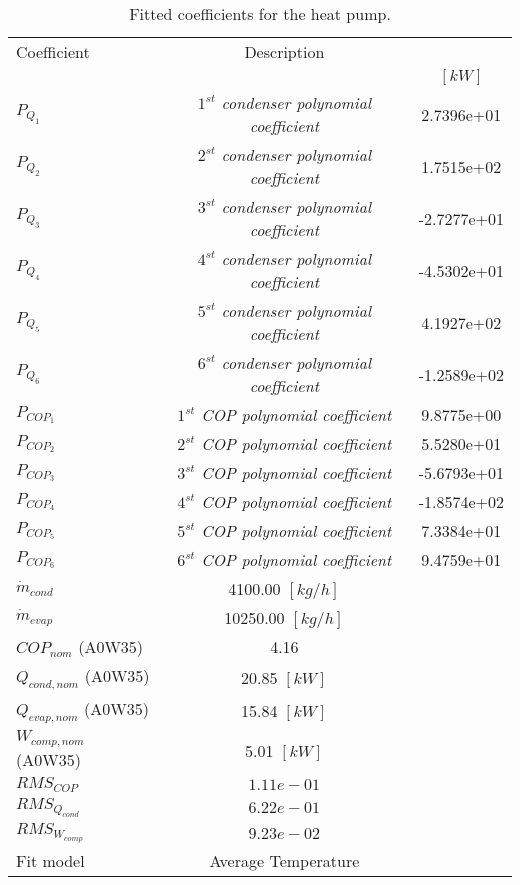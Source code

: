 \documentclass[english]{SPFShortReport}
\author{Dani Carbonell}
\begin{document}
\begin{table}[!ht]
\begin{small}
\caption{Fitted coefficients for the heat pump.}
\begin{center}
\resizebox{12cm}{!} 
{
\begin{tabular}{l | c c } 
\hline
\hline
Coefficient &Description & \\ 
 & &$[kW]$\\ 
\hline
$P_{Q_{1}}$ & \emph{$1^{st}$ condenser polynomial coefficient}  & 2.7396e+01    \\ 
$P_{Q_{2}}$ & \emph{$2^{st}$ condenser polynomial coefficient}  & 1.7515e+02    \\ 
$P_{Q_{3}}$ & \emph{$3^{st}$ condenser polynomial coefficient}  & -2.7277e+01    \\ 
$P_{Q_{4}}$ & \emph{$4^{st}$ condenser polynomial coefficient}  & -4.5302e+01    \\ 
$P_{Q_{5}}$ & \emph{$5^{st}$ condenser polynomial coefficient}  & 4.1927e+02    \\ 
$P_{Q_{6}}$ & \emph{$6^{st}$ condenser polynomial coefficient}  & -1.2589e+02    \\ 
\hline
$P_{COP_{1}}$ & \emph{$1^{st}$ COP polynomial coefficient}  & 9.8775e+00    \\ 
$P_{COP_{2}}$ & \emph{$2^{st}$ COP polynomial coefficient}  & 5.5280e+01    \\ 
$P_{COP_{3}}$ & \emph{$3^{st}$ COP polynomial coefficient}  & -5.6793e+01    \\ 
$P_{COP_{4}}$ & \emph{$4^{st}$ COP polynomial coefficient}  & -1.8574e+02    \\ 
$P_{COP_{5}}$ & \emph{$5^{st}$ COP polynomial coefficient}  & 7.3384e+01    \\ 
$P_{COP_{6}}$ & \emph{$6^{st}$ COP polynomial coefficient}  & 9.4759e+01    \\ 
\hline
$\dot m_{cond}$ & 4100.00 $[kg/h]$ \\ 
$\dot m_{evap}$ & 10250.00 $[kg/h]$ \\ 
\hline
$COP_{nom}$ (A0W35)& 4.16 \\ 
$Q_{cond,nom}$ (A0W35)& 20.85 $[kW]$\\ 
$Q_{evap,nom}$ (A0W35)& 15.84 $[kW]$\\ 
$W_{comp,nom}$ (A0W35)& 5.01 $[kW]$\\ 
\hline
 $RMS_{COP}$ & $1.11e-01$ \\ 
 $RMS_{Q_{cond}}$ & $6.22e-01$ \\ 
 $RMS_{W_{comp}}$ & $9.23e-02$ \\ 
\hline
Fit model & Average Temperature\\ 
\hline
\hline
\end{tabular}
}
\label{CoefTable}
\end{center}
\end{small}
\end{table}
\end{document}
